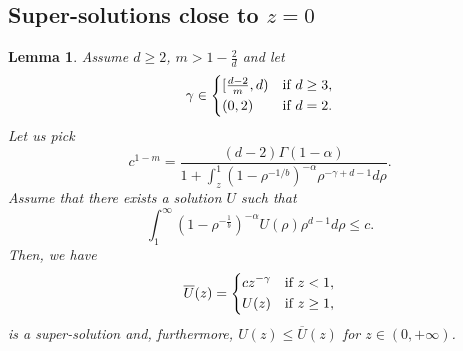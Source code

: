 \documentclass[a4paper]{article}
\newtheorem{lemma}[theorem]{Lemma}
\theoremstyle{definition}
\begin{document}
%
%
%
%
%
%
%
%
%
%
%
%
%
%

%

%
%
%
%
%

%

%
%

%

%

%

\subsection{Super-solutions close to $z = 0$}
%
%
\begin{lemma}
\label{lem:fast supersolution close 0}
Assume $d \ge 2$, $m > 1 - \frac{2}{d}$ and let
\begin{equation*}
  \gamma \in
  \begin{dcases}
    [\tfrac{d-2}{m}, d) & \text{if } d \ge 3, \\
    (0,2)               & \text{if } d= 2.
  \end{dcases}
\end{equation*}
Let us pick
\[
  c^{1-m} = \frac{(d-2)\Gamma(1-\alpha)}{1 + \int_z^1 (1-{\rho}^{-1/b})^{-\alpha} \rho^{-\gamma+d-1} d \rho }.
\]
Assume that there exists a solution $U$ such that
\begin{equation*}
  \int_1^\infty (1-\rho^{-\frac 1 b})^{-\alpha} U(\rho) \rho^{d-1} d \rho \le c.
\end{equation*}
Then, we have
\begin{equation*}
  \overline{ U}(z) =
  \begin{dcases}
    c z^{-\gamma} & \text{if } z < 1,
    \\
    U(z)          & \text{if } z \ge 1,
  \end{dcases}
\end{equation*}
is a super-solution and, furthermore, $U(z) \le \overline{ U}(z)$ for $z \in (0,+\infty)$.
\end{lemma}
%
\end{document}
